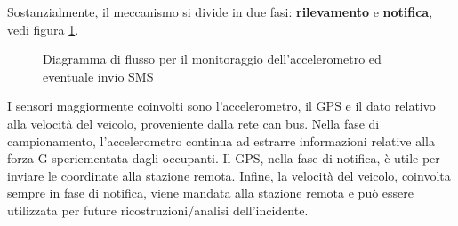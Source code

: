 \documentclass[12pt, a4paper, italian]{report}
\numberwithin{figure}{chapter}
\numberwithin{table}{chapter}
\begin{document}
Sostanzialmente, il meccanismo si divide in due fasi: \textbf{rilevamento} e \textbf{notifica}, vedi figura \ref{fig:rilevamentoInvioIncidente}.
\begin{figure}[h]
    \centering
    \caption{Diagramma di flusso per il monitoraggio dell'accelerometro ed eventuale invio SMS}
    \label{fig:rilevamentoInvioIncidente}
\end{figure}

I sensori maggiormente coinvolti sono l'accelerometro, il GPS e il dato relativo alla velocità del veicolo, proveniente dalla rete can bus. Nella fase di campionamento, l'accelerometro continua ad estrarre informazioni relative alla forza G speriementata dagli occupanti. Il GPS, nella fase di notifica, è utile per inviare le coordinate alla stazione remota. Infine, la velocità del veicolo, coinvolta sempre in fase di notifica, viene mandata alla stazione remota e può essere utilizzata per future ricostruzioni/analisi dell'incidente. \cite{shubham2021survey}
\end{document}
